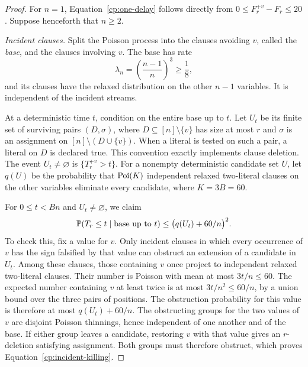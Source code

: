 \begin{proof}
For $n=1$, Equation~\eqref{cp:one-delay} follows directly from
$0\le F_r^{+v}-F_r\le20$. Suppose henceforth that $n\ge2$.

\emph{Incident clauses.}
Split the Poisson process into the clauses avoiding $v$, called the
\emph{base}, and the clauses involving $v$. The base has rate
\[
 \lambda_n=\left(\frac{n-1}{n}\right)^3\ge\frac18,
\]
and its clauses have the relaxed distribution on the other $n-1$ variables.
It is independent of the incident streams.

At a deterministic time $t$, condition on the entire base up to $t$.
Let $U_t$ be its finite set of surviving pairs $(D,\sigma)$, where
$D\subseteq[n]\setminus\{v\}$ has size at most $r$ and $\sigma$ is an
assignment on $[n]\setminus(D\cup\{v\})$. When a literal is tested on such a
pair, a literal on $D$ is declared true. This convention exactly implements
clause deletion. The event $U_t\ne\varnothing$ is $\{T_r^{+v}>t\}$.
For a nonempty deterministic candidate set $U$, let $q(U)$ be the probability
that $\operatorname{Poi}(K)$ independent relaxed two-literal clauses on the other
variables eliminate every candidate, where $K=3B=60$.

For $0\le t<Bn$ and $U_t\ne\varnothing$, we claim
\begin{equation}\label{cp:incident-killing}
 \mathbb P(T_r\le t\mid\text{base up to }t)
 \le \bigl(q(U_t)+60/n\bigr)^2.
\end{equation}
To check this, fix a value for $v$. Only incident clauses in which every
occurrence of $v$ has the sign falsified by that value can obstruct an
extension of a candidate in $U_t$. Among these clauses, those containing
$v$ once project to independent relaxed two-literal clauses. Their number
is Poisson with mean at most $3t/n\le60$. The expected number containing
$v$ at least twice is at most $3t/n^2\le60/n$, by a union bound over the
three pairs of positions. The obstruction probability for this value is
therefore at most $q(U_t)+60/n$. The obstructing groups for the two values
of $v$ are disjoint Poisson thinnings, hence independent of one another
and of the base. If either group leaves a candidate, restoring $v$ with
that value gives an $r$-deletion satisfying assignment. Both groups must
therefore obstruct, which proves Equation~\eqref{cp:incident-killing}.


\end{proof}
